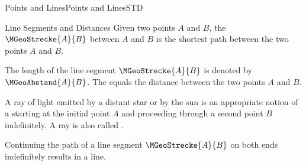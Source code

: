 \begin{MXContent}{Points and Lines}{Points and Lines}{STD}
\begin{MXInfo}{Line Segments and Distances}
Given two points $A$ and $B$, the  $\MGeoStrecke{A}{B}$
between $A$ and $B$ is the shortest path between the two points $A$ and $B$.

\begin{center}
\end{center}

The length of the line segment $\MGeoStrecke{A}{B}$ is denoted by $\MGeoAbstand{A}{B}$. 
The  equals the distance between the two points $A$ and $B$.
\end{MXInfo}

A ray of light emitted by a distant star or by the sun is an appropriate notion of a 
 starting at the initial point $A$ and proceeding through a second point $B$ indefinitely. A
ray is also called .

\begin{center}
\end{center}

Continuing the path of a line segment $\MGeoStrecke{A}{B}$ on both ends indefinitely results in 
a line.


\end{MXContent}

